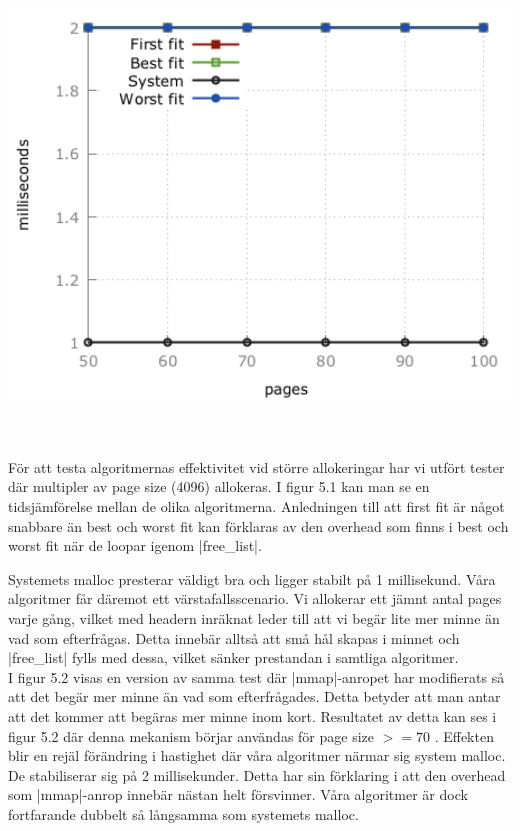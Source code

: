 \documentclass[paper=a4, fontsize=11pt]{scrartcl} %
\numberwithin{equation}{section} %
\numberwithin{figure}{section} %
\numberwithin{table}{section} %
\begin{document}
\begin{minipage}{.3\textwidth}
    \centering
    \includegraphics[width=1\textwidth]{images/time_plot_big3.png}
    \label{fig:big3}
\end{minipage}\\\\

För att testa algoritmernas effektivitet vid större allokeringar har vi utfört
tester där multipler av page size (4096) allokeras. I figur 5.1 kan man se en
tidsjämförelse mellan de olika algoritmerna. Anledningen till att first fit är 
något snabbare än best och worst fit kan förklaras av den overhead som finns i 
best och worst fit när de loopar igenom |free_list|.

Systemets malloc presterar väldigt bra och ligger stabilt på 1 millisekund.
Våra algoritmer får däremot ett värstafallsscenario. Vi allokerar ett jämnt
antal pages varje gång, vilket med headern inräknat leder till att vi begär
lite mer minne än vad som efterfrågas. Detta innebär alltså att små hål
skapas i minnet och |free_list| fylls med dessa, vilket sänker prestandan
i samtliga algoritmer.\\

I figur 5.2 visas en version av samma test där |mmap|-anropet har modifierats
så att det begär mer minne än vad som efterfrågades. Detta betyder att man 
antar att det kommer att begäras mer minne inom kort. Resultatet av detta kan
ses i figur 5.2 där denna mekanism börjar användas för page size $>= 70$ .
Effekten blir en rejäl förändring i hastighet där våra algoritmer närmar sig
system malloc. De stabiliserar sig på 2 millisekunder. Detta har sin förklaring
i att den overhead som |mmap|-anrop innebär nästan helt försvinner.
Våra algoritmer är dock fortfarande dubbelt så långsamma som systemets malloc.\\
\end{document}
